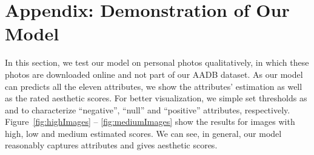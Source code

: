 \documentclass[runningheads]{llncs}
\begin{document}
\section*{Appendix: Demonstration of Our Model}
\label{sec:visualDemo}
In this section,
we test our model on personal photos qualitatively,
in which these photos are downloaded online and not part of our AADB dataset.
As our model can predicts all the eleven attributes,
we show the attributes' estimation as well as the rated aesthetic scores.
For better visualization,
we simple set thresholds as   and  to characterize ``negative'', ``null'' and  ``positive'' attributes, respectively.
Figure~\ref{fig:highImages} -- \ref{fig:mediumImages}  show the results for images with high, low and medium estimated scores.
We can see, in general, our model reasonably captures attributes and gives aesthetic scores.
\end{document}
